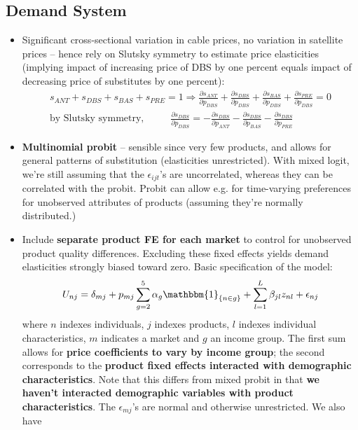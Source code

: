 \documentclass[11pt]{article}
\begin{document}
\subsection{Demand System}
	\begin{itemize}
		\item Significant cross-sectional variation in cable prices, no variation in satellite prices -- hence rely on Slutsky symmetry to estimate price elasticities (implying impact of increasing price of DBS by one percent equals impact of decreasing price of substitutes by one percent):
		\begin{equation*}
			\begin{gathered}
					s_{ANT} + s_{DBS} + s_{BAS} + s_{PRE} = 1 \Rightarrow \frac{\partial s_{ANT}}{\partial p_{DBS}} + \frac{\partial s_{DBS}}{\partial  p_{DBS}} + \frac{\partial s_{BAS}}{\partial p_{DBS}} + \frac{\partial s_{PRE}}{\partial p_{DBS}} = 0 \\
					\text{by Slutsky symmetry, } \hspace{1cm}
					\frac{\partial s_{DBS}}{\partial p_{DBS}} = - \frac{\partial s_{DBS}}{\partial  p_{ANT}} - \frac{\partial s_{DBS}}{\partial p_{BAS}} - \frac{\partial s_{DBS}}{\partial p_{PRE}}
			\end{gathered}
		\end{equation*}
		\item \textbf{Multinomial probit} -- sensible since very few products, and allows for general patterns of substitution (elasticities unrestricted). With mixed logit, we're still assuming that the $\epsilon_{ijt}$'s are uncorrelated, whereas they can be correlated with the probit. Probit can allow e.g. for time-varying preferences for unobserved attributes of products (assuming they're normally distributed.)
		\item Include \textbf{separate product FE for each market} to control for unobserved product quality differences. Excluding these fixed effects yields demand elasticities strongly biased toward zero. Basic specification of the model:
		\begin{equation}
		U_{nj} = \delta_{mj} + p_{mj} \sum_{g=2}^{5}\alpha_g \mathbbm{1}_{\{n \in g\}} + \sum_{l=1}^{L} \beta_{jl}z_{nl}+\epsilon_{nj}
		\end{equation}
		where $n$ indexes individuals, $j$ indexes products, $l$ indexes individual characteristics, $m$ indicates a market and $g$ an income group. The first sum allows for \textbf{price coefficients to vary by income group}; the second corresponds to the \textbf{product fixed effects interacted with demographic characteristics}. Note that this differs from mixed probit in that \textbf{we haven't interacted demographic variables with product characteristics}. The $\epsilon_{mj}$'s are normal and otherwise unrestricted. We also have

\end{itemize}
\end{document}
